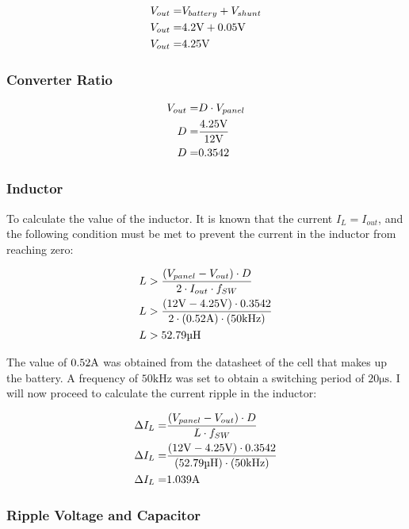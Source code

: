 \begin{align}\label{Buck1}
  V_{out} =& V_{battery} + V_{shunt}\notag\\
  V_{out} =& 4.2\volt+0.05\volt\notag\\
  V_{out} =& 4.25\volt
\end{align}

\subsubsection*{Converter Ratio}

\begin{align}\label{Buck2}
  V_{out}=& D \cdot V_{panel}\notag \\
  D =& \frac{4.25\volt}{12\volt} \notag \\
  D =& 0.3542
\end{align}

\subsubsection*{Inductor}

To calculate the value of the inductor. It is known that the current $I_{L} = I_{out}$, and the following condition must be met to prevent the current in the inductor from reaching zero:

\begin{align}\label{InductorBuck}
   L &> \frac{(V_{panel}-V_{out})\cdot D}{2\cdot I_{out} \cdot f_{SW}} \notag\\
   L &> \frac{(12\volt-4.25\volt)\cdot 0.3542}{2\cdot (0.52\ampere) \cdot (50\si{\kHz})} \notag \\
   L &> 52.79\si{\micro\henry}
\end{align}

The value of $0.52\ampere$ was obtained from the datasheet of the cell that makes up the battery. A frequency of $50\si{\kHz}$ was set to obtain a switching period of $20\si{\micro\second}$. I will now proceed to calculate the current ripple in the inductor:

\begin{align}\label{RizadoInductor}
  \Delta I_{L} =& \frac{(V_{panel}-V_{out})\cdot D}{L\cdot f_{SW}}\notag \\
  \Delta I_{L} =& \frac{(12\volt-4.25\volt)\cdot 0.3542}{(52.79\si{\micro\henry})\cdot (50\si{\kHz})}\notag \\
  \Delta I_{L} = & 1.039\ampere
\end{align} 

\subsubsection*{Ripple Voltage and Capacitor}

